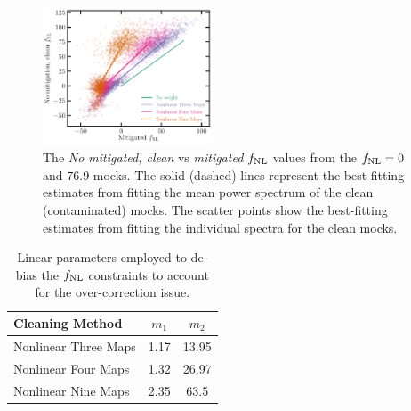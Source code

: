 \begin{figure}
\centering
\includegraphics[width=0.45\textwidth]{figures/fnlbias}
\caption{The \textit{No mitigated, clean} vs \textit{mitigated} $f_{\rm NL}$ values from the $f_{\rm NL}=0$ and $76.9$ mocks. The solid (dashed) lines represent the best-fitting estimates from fitting the mean power spectrum of the clean (contaminated) mocks. The scatter points show the best-fitting estimates from fitting the individual spectra for the clean mocks.}\label{fig:fnlbias}
\end{figure}

\begin{table}
\begin{center}
\caption{Linear parameters employed to de-bias the $f_{\rm NL}$ constraints to account for the over-correction issue. 
}\label{tab:debiasparams}
\begin{tabular}{lcc}
\hline
\hline
\textbf{Cleaning Method} & $m_{1}$ & $m_{2}$ \\
\hline
Nonlinear Three Maps & 1.17 & 13.95 \\
Nonlinear Four Maps & 1.32 & 26.97 \\
Nonlinear Nine Maps & 2.35 & 63.5\\
\hline
\end{tabular}
\end{center}
\end{table}
